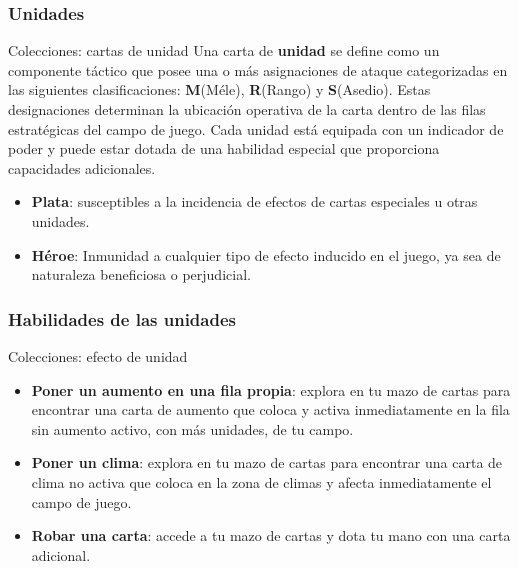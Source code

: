 \documentclass[a4paper, 12pt]{beamer}
\begin{document}
\subsubsection{Unidades}
\begin{frame}{\textcolor{plata}{Colecciones: cartas de unidad}}
Una carta de \textbf{unidad} se define como un componente táctico que posee una o más asignaciones de ataque categorizadas en las siguientes clasificaciones: \textbf{M}(Méle), \textbf{R}(Rango) y \textbf{S}(Asedio). Estas designaciones determinan la ubicación operativa de la carta dentro de las filas estratégicas del campo de juego. Cada unidad está equipada con un indicador de poder y puede estar dotada de una habilidad especial que proporciona capacidades adicionales.
\begin{itemize}
\item \small \textbf{\textcolor{plata}{Plata}}: susceptibles a la incidencia de efectos de cartas especiales u otras unidades.
\item \small \textbf{\textcolor{dorado}{Héroe}}: Inmunidad a cualquier tipo de efecto inducido en el juego, ya sea de naturaleza beneficiosa o perjudicial.
\end{itemize}
\end{frame}

\subsubsection{Habilidades de las unidades}
\begin{frame}{\textcolor{plata}{Colecciones: efecto de unidad}}

\begin{itemize}
\item \textbf{Poner un aumento en una fila propia}: explora en tu mazo de cartas para encontrar una carta de aumento que coloca y activa inmediatamente en la  fila sin aumento activo, con más unidades, de tu campo.
\item \textbf{Poner un clima}: explora en tu mazo de cartas para encontrar una carta de clima no activa que coloca en la zona de climas y afecta inmediatamente el campo de juego.
\item \textbf{Robar una carta}: accede a tu mazo de cartas y dota tu mano con una carta adicional.
\end{itemize}

\end{frame}
\end{document}
